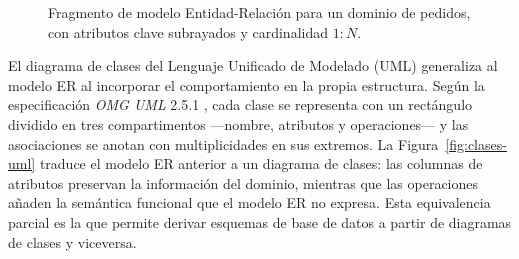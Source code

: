 \documentclass[11pt,a4paper,oneside]{report}
\begin{document}
	\begin{figure}[htbp]
		\centering
		\caption{Fragmento de modelo Entidad-Relaci\'on para un dominio de pedidos, con atributos clave subrayados y cardinalidad $1{:}N$.}
		\label{fig:er-ejemplo}
	\end{figure}
	
	El diagrama de clases del Lenguaje Unificado de Modelado (UML) generaliza al modelo ER al incorporar el comportamiento en la propia estructura. Seg\'un la especificaci\'on \textit{OMG UML} 2.5.1 \citep{omg_uml_2017}, cada clase se representa con un rect\'angulo dividido en tres compartimentos ---nombre, atributos y operaciones--- y las asociaciones se anotan con multiplicidades en sus extremos. La Figura~\ref{fig:clases-uml} traduce el modelo ER anterior a un diagrama de clases: las columnas de atributos preservan la informaci\'on del dominio, mientras que las operaciones a\~naden la sem\'antica funcional que el modelo ER no expresa. Esta equivalencia parcial es la que permite derivar esquemas de base de datos a partir de diagramas de clases y viceversa.
	
\end{document}
